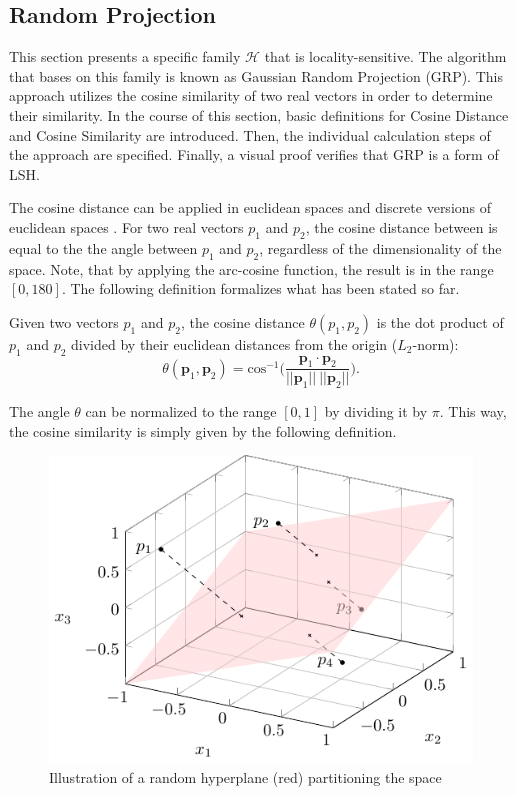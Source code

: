 \subsection{Random Projection}\label{subsec:random_projection}

This section presents a specific family $\mathcal{H}$ that is locality-sensitive. The algorithm that bases on this family is known as Gaussian Random Projection (GRP). This approach utilizes the cosine similarity of two real vectors in order to determine their similarity. In the course of this section, basic definitions for Cosine Distance and Cosine Similarity are introduced. Then, the individual calculation steps of the approach are specified. Finally, a visual proof verifies that GRP is a form of LSH.

The cosine distance can be applied in euclidean spaces and discrete versions of euclidean spaces \cite[95]{leskovec_rajaraman_ullman_2014}. For two real vectors $p_1$ and $p_2$, the cosine distance between is equal to the the angle between $p_1$ and $p_2$, regardless of the dimensionality of the space. Note, that by applying the arc-cosine function, the result is in the range $[0, 180]$. The following definition formalizes what has been stated so far.

\begin{definition}
    Given two vectors $p_1$ and $p_2$, the cosine distance $\theta(p_1, p_2)$ is the dot product of $p_1$ and $p_2$ divided by their euclidean distances from the origin ($L_2$-norm):
    \begin{equation}
        \theta(\bm{p}_1, \bm{p}_2) = \text{cos}^{-1} \bigg( \frac{\bm{p}_1 \cdot \bm{p}_2}{||\bm{p}_1|| \: ||\bm{p}_2||} \Bigg).
    \end{equation}
\end{definition}

The angle $\theta$ can be normalized to the range $[0, 1]$ by dividing it by $\pi$. This way, the cosine similarity is simply given by the following definition.

\begin{figure}[t!]
    \centering
    \includegraphics[width=0.8\linewidth]{tikz/random_projection.pdf}
    \caption{Illustration of a random hyperplane (red) partitioning the space}
    \label{fig:rp_3d}
\end{figure}

